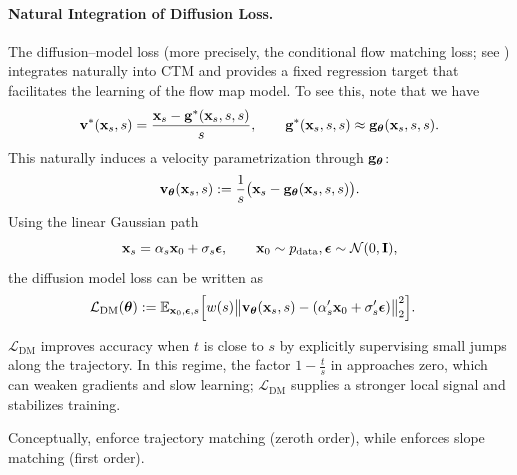 \paragraph{Natural Integration of Diffusion Loss.}
The diffusion–model loss (more precisely, the conditional flow matching loss; see ) integrates naturally into CTM and provides a fixed regression target that facilitates the learning of the flow map model. To see this, note that we have
\[
{\mathbf{v}}^*({\mathbf{x}}_s, s)
= \frac{{\mathbf{x}}_s - {\mathbf{g}}^*({\mathbf{x}}_s, s, s)}{s},
\qquad 
{\mathbf{g}}^*({\mathbf{x}}_s, s, s) \approx {\mathbf{g}}_{{\bm{\theta}}}({\mathbf{x}}_s, s, s).
\]
This naturally induces a velocity parametrization through ${\mathbf{g}}_{{\bm{\theta}}}$:
\[
{\mathbf{v}}_{{\bm{\theta}}}({\mathbf{x}}_s, s)
:= \frac{1}{s}\bigl({\mathbf{x}}_s - {\mathbf{g}}_{{\bm{\theta}}}({\mathbf{x}}_s, s, s)\bigr).
\]
Using the linear Gaussian path
\[
{\mathbf{x}}_s = \alpha_s {\mathbf{x}}_0 + \sigma_s {\bm{\epsilon}},
\qquad
{\mathbf{x}}_0 \sim p_{\mathrm{data}}, 
{\bm{\epsilon}} \sim \mathcal N(0, \mathbf I),
\]
the diffusion model loss can be written as
\begin{align}\label{eq:ctm-dsm}
\mathcal L_{\mathrm{DM}}({\bm{\theta}})
&:= 
\mathbb{E}_{{\mathbf{x}}_0, {\bm{\epsilon}}, s}
\Bigl[
w(s)
\bigl\|
 {\mathbf{v}}_{{\bm{\theta}}}({\mathbf{x}}_s, s) - \left(\alpha_s' {\mathbf{x}}_0 + \sigma_s' {\bm{\epsilon}}\right)
\bigr\|_2^2
\Bigr].
\end{align}



$\mathcal L_{\mathrm{DM}}$ improves accuracy when $t$ is close to $s$ by explicitly supervising small
jumps along the trajectory. In this regime, the factor $1-\tfrac{t}{s}$ in
 approaches zero, which can weaken gradients and slow
learning; $\mathcal L_{\mathrm{DM}}$ supplies a stronger local signal and stabilizes training.  

Conceptually,  enforce
trajectory matching (zeroth order), while  enforces slope
matching (first order).

